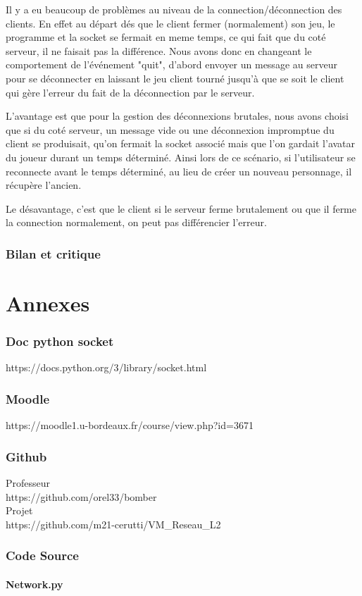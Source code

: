 \documentclass[a4paper]{article}
\begin{document}
		Il y a eu beaucoup de problèmes au niveau de la connection/déconnection des clients. En effet au départ dés que le client fermer (normalement) son jeu, le programme et la socket se fermait en meme temps, ce qui fait que du coté serveur, il ne faisait pas la différence. Nous avons donc en changeant le comportement de l'événement "quit", d'abord envoyer un message au serveur pour se déconnecter en laissant le jeu client tourné jusqu'à que se soit le client qui gère l'erreur du fait de la déconnection par le serveur.
		
		L'avantage est que pour la gestion des déconnexions brutales, nous avons choisi que si du coté serveur, un message vide ou une déconnexion impromptue du client se produisait, qu'on fermait la socket associé mais que l'on gardait l'avatar du joueur durant un temps déterminé. Ainsi lors de ce scénario, si l'utilisateur se reconnecte avant le temps déterminé, au lieu de créer un nouveau personnage, il récupère l'ancien.
		
		Le désavantage, c'est que le client si le serveur ferme brutalement ou que il ferme la connection normalement, on peut pas différencier l'erreur.
		

	\section{Bilan et critique}

\newpage
\appendix
\part{Annexes}

\section{Doc python socket} \label{docpysoc}

https://docs.python.org/3/library/socket.html

\section{Moodle} \label{moodle}

https://moodle1.u-bordeaux.fr/course/view.php?id=3671

\section{Github} \label{github}

Professeur
\\
https://github.com/orel33/bomber
\\

Projet
\\
https://github.com/m21-cerutti/VM\_Reseau\_L2
\\

\newpage
\section{Code Source}

\subsection{Network.py} \label{network.py}
\end{document}
